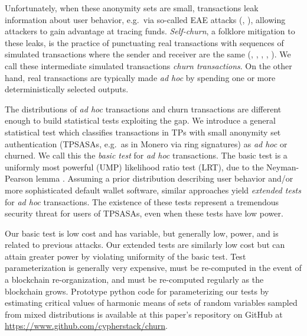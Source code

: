 \documentclass{tran-l}
\theoremstyle{cor}
\theoremstyle{definition}
\theoremstyle{remark}
\theoremstyle{conjecture}
\numberwithin{equation}{section}
\begin{document}
Unfortunately, when these anonymity sets are small, transactions leak information about user behavior, e.g.\ via so-called EAE attacks (\cite{breaking_monero_poisoned_outputs}, \cite{ali2024scaling}), allowing attackers to gain advantage at tracing funds.
\textit{Self-churn}, a folklore mitigation to these leaks, is the practice of punctuating real transactions with sequences of simulated transactions where the sender and receiver are the same (\cite{meiklejohn2013fistful}, \cite{chator2023practice}, \cite{ranshous2017exchange}, \cite{yang2019behavioral}, \cite{Pernice2021Cryptocurrencies}).
We call these intermediate simulated transactions \textit{churn transactions}.
On the other hand, real transactions are typically made \textit{ad hoc} by spending one or more deterministically selected outputs.

The distributions of \textit{ad hoc} transactions and churn transactions are different enough to build statistical tests exploiting the gap.
We introduce a general statistical test which classifies transactions in TPs with small anonymity set authentication (TPSASAs, e.g.\ as in Monero via ring signatures) as \textit{ad hoc} or churned.
We call this the \textit{basic test} for \textit{ad hoc} transactions.
The basic test is a uniformly most powerful (UMP) likelihood ratio test (LRT), due to the Neyman-Pearson lemma \cite{neyman1933ix}.
Assuming a prior distribution describing user behavior and/or more sophisticated default wallet software, similar approaches yield \textit{extended tests} for \textit{ad hoc} transactions.
The existence of these tests represent a tremendous security threat for users of TPSASAs, even when these tests have low power.

Our basic test is low cost and has variable, but generally low, power, and is related to previous attacks.
Our extended tests are similarly low cost but can attain greater power by violating uniformity of the basic test.
Test parameterization is generally very expensive, must be re-computed in the event of a blockchain re-organization, and must be re-computed regularly as the blockchain grows.
Prototype python code for parameterizing our tests by estimating critical values of harmonic means of sets of random variables sampled from mixed distributions is available at this paper's repository on GitHub at \url{https://www.github.com/cypherstack/churn}.
\end{document}
